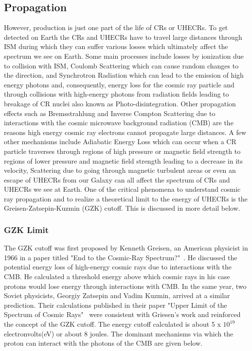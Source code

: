 \subsection{Propagation}
\label{subsec:crprop}
However, production is just one part of the life of CRs or UHECRs. To get detected on Earth the CRs and UHECRs have to travel large distances through ISM during which they can suffer various losses which ultimately affect the spectrum we see on Earth. Some main processes include losses by ionization due to collision with ISM, Coulomb Scattering which can cause random changes to the direction, and Synchrotron Radiation which can lead to the emission of high energy photons and, consequently, energy loss for the cosmic ray particle and through collisions with high-energy photons from radiation fields leading to breakage of CR nuclei also known as Photo-disintegration. Other propagation effects such as Bremsstrahlung and Inverse Compton Scattering due to interactions with the cosmic microwave background radiation (CMB) are the reasons high energy cosmic ray electrons cannot propagate large distances. A few other mechanisms include Adiabatic Energy Loss which can occur when a CR particle traverses through regions of high pressure or magnetic field strength to regions of lower pressure and magnetic field strength leading to a decrease in its velocity, Scattering due to going through magnetic turbulent areas or even an escape of UHECRs from our Galaxy can all affect the spectrum of CRs and UHECRs we see at Earth. One of the critical phenomena to understand cosmic ray propagation and to realize a theoretical limit to the energy of UHECRs is the Greisen-Zatsepin-Kuzmin (GZK) cutoff. This is discussed in more detail below.

\subsubsection{GZK Limit}
\label{subsubsec:GZK} 
The GZK cutoff was first proposed by Kenneth Greisen, an American physicist in 1966 in a paper titled "End to the Cosmic-Ray Spectrum?"~\cite{PhysRevLett.16.748}. He discussed the potential energy loss of high-energy cosmic rays due to interactions with the CMB. He calculated a threshold energy above which cosmic rays in his case protons would lose energy through interactions with CMB. In the same year, two Soviet physicists, Georgiy Zatsepin and Vadim Kuzmin, arrived at a similar prediction. Their calculations published in their paper "Upper Limit of the Spectrum of Cosmic Rays"~\cite{Zatsepin:1966jv} were consistent with Griesen's work and reinforced the concept of the GZK cutoff.  
The energy cutoff calculated is about 5 x $10^{19}$ electronvolts(eV) or about 8 joules. The dominant mechanisms via which the proton can interact with the photons of the CMB are given below. 


